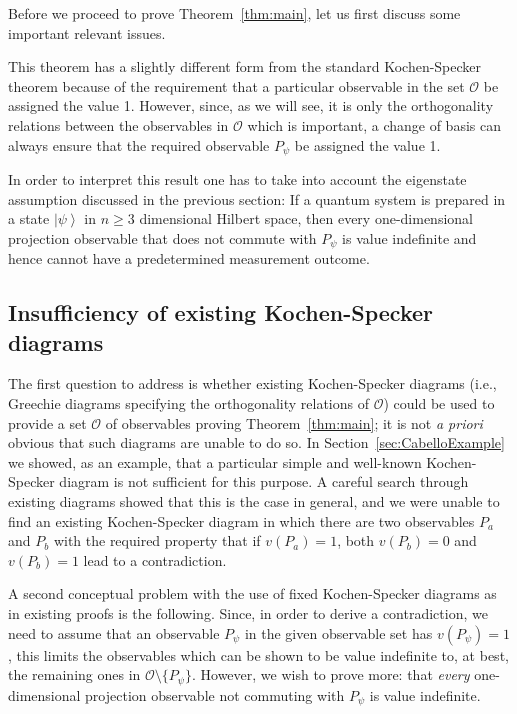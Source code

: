 \documentclass[%
 superscriptaddress,
 preprint,
 showpacs,
 showkeys,
 nofootinbib,
  amsmath,amssymb,
  aps,
  longbibliography,
  floatfix,
 ]{revtex4-1}
\theoremstyle{definition}
\newcommand{\ket}[1]{\left| #1 \right>}
\begin{document}
Before we proceed to prove Theorem~\ref{thm:main}, let us first discuss some important relevant issues.

This theorem has a slightly different form from the standard Kochen-Specker theorem because of the requirement that a particular observable in the set $\mathcal{O}$ be assigned the value 1.
However, since, as we will see, it is only the orthogonality relations between the observables in $\mathcal{O}$ which is important, a change of basis can always ensure that the required observable $P_\psi$ be assigned the value 1.

In order to interpret this result one has to take into account the eigenstate assumption discussed in the previous section: If a quantum system is prepared in a state $\ket{\psi}$ in $n\ge 3$ dimensional Hilbert space, then every {\color{blue} one-dimensional} projection observable that does not commute with $P_\psi$ is value indefinite and hence cannot have a predetermined measurement outcome.


\subsection{Insufficiency of existing Kochen-Specker diagrams}

The first question to address is whether existing Kochen-Specker diagrams (i.e., Greechie diagrams specifying the orthogonality relations of $\mathcal{O}$) could be used to provide a set $\mathcal{O}$ of observables proving Theorem~\ref{thm:main};
it is not \emph{a priori} obvious that such diagrams are unable to do so.
In Section~\ref{sec:CabelloExample} we showed, as an example, that a particular simple and well-known Kochen-Specker diagram is not sufficient for this purpose.
A careful search through existing diagrams showed that this is the case in general, and we were unable to find an existing Kochen-Specker diagram in which there are two observables $P_a$ and $P_b$ with the required property that if $v(P_a)=1$, both $v(P_b)=0$ and $v(P_b)=1$ lead to a contradiction.



A second conceptual problem with the use of fixed Kochen-Specker diagrams as in existing proofs is the following.
Since, in order to derive a contradiction, we need to assume that an observable $P_\psi$ in the given observable set has $v(P_\psi)=1$, this limits the observables which can be shown to be value indefinite to, at best, the remaining ones in $\mathcal{O}\setminus \{P_\psi\}$.
However, we wish to prove more: that \emph{every} {\color{blue}one-dimensional \color{blue}projection} observable not commuting with $P_\psi$ is value indefinite.
\end{document}
